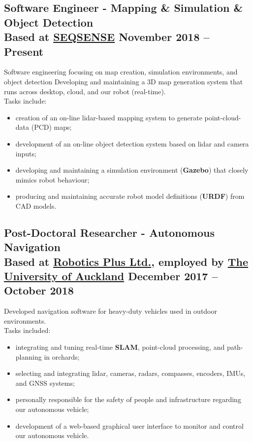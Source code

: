 \documentclass[english]{extarticle}
\begin{document}
\subsection*{Software Engineer - Mapping \& Simulation \& Object Detection \\\textmd{\footnotesize Based at \href{https://www.seqsense.com/}{SEQSENSE} \hfill{} \textbf{November 2018 -- Present}}}
Software engineering focusing on map creation, simulation environments, and object detection
Developing and maintaining a 3D map generation system that runs across desktop, cloud, and our robot (real-time).
\\Tasks include:
\begin{itemize}
    \item creation of an on-line lidar-based mapping system to generate point-cloud-data (PCD) maps;
    \item development of an on-line object detection system based on lidar and camera inputs;
    \item developing and maintaining a simulation environment (\textbf{Gazebo}) that closely mimics robot behaviour;
    \item producing and maintaining accurate robot model definitions (\textbf{URDF}) from CAD models.
\end{itemize}

\subsection*{Post-Doctoral Researcher - Autonomous Navigation\\\textmd{\footnotesize Based at \href{https://www.roboticsplus.co.nz/}{Robotics Plus Ltd.}, employed by \href{https://auckland.ac.nz}{The University of Auckland} \hfill{} \textbf{December 2017 -- October 2018}}}
Developed navigation software for heavy-duty vehicles used in outdoor environments.
\\Tasks included:
\begin{itemize}
    \item integrating and tuning real-time \textbf{SLAM}, point-cloud processing, and path-planning in orchards;
    \item selecting and integrating lidar, cameras, radars, compasses, encoders, IMUs, and GNSS systems;
    \item personally responsible for the safety of people and infrastructure regarding our autonomous vehicle;
    \item development of a web-based graphical user interface to monitor and control our autonomous vehicle.
\end{itemize}
\end{document}
